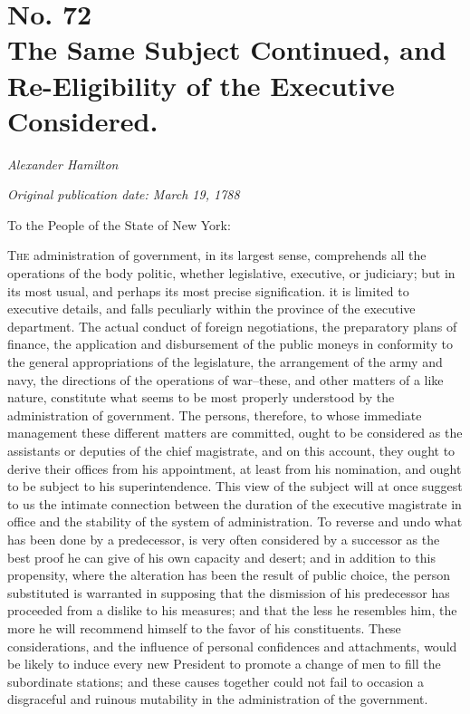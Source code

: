 \chapter[No. 72: The Same Subject Continued, and Re-Eligibility of the Executive Considered.]{No. 72\\ {\small The Same Subject Continued, and Re-Eligibility of the Executive Considered.}}

\textit{Alexander Hamilton}

\textit{Original publication date: March 19, 1788}
\vspace{1cm}

To the People of the State of New York:
\vspace{.4cm}

\textsc{The} administration of government, in its largest sense, comprehends all the operations of the body politic, whether legislative, executive, or judiciary; but in its most usual, and perhaps its most precise signification. 
it is limited to executive details, and falls peculiarly within the province of the executive department. 
The actual conduct of foreign negotiations, the preparatory plans of finance, the application and disbursement of the public moneys in conformity to the general appropriations of the legislature, the arrangement of the army and navy, the directions of the operations of war--these, and other matters of a like nature, constitute what seems to be most properly understood by the administration of government. 
The persons, therefore, to whose immediate management these different matters are committed, ought to be considered as the assistants or deputies of the chief magistrate, and on this account, they ought to derive their offices from his appointment, at least from his nomination, and ought to be subject to his superintendence. 
This view of the subject will at once suggest to us the intimate connection between the duration of the executive magistrate in office and the stability of the system of administration. 
To reverse and undo what has been done by a predecessor, is very often considered by a successor as the best proof he can give of his own capacity and desert; and in addition to this propensity, where the alteration has been the result of public choice, the person substituted is warranted in supposing that the dismission of his predecessor has proceeded from a dislike to his measures; and that the less he resembles him, the more he will recommend himself to the favor of his constituents. 
These considerations, and the influence of personal confidences and attachments, would be likely to induce every new President to promote a change of men to fill the subordinate stations; and these causes together could not fail to occasion a disgraceful and ruinous mutability in the administration of the government.

